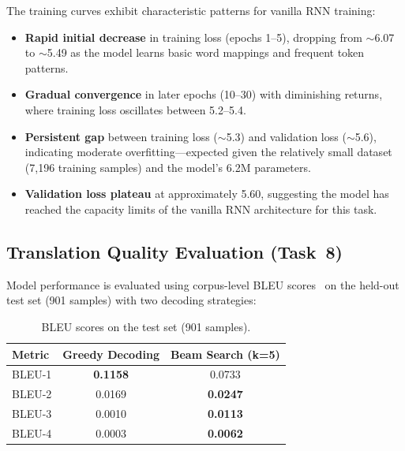 \documentclass[runningheads]{llncs}
\begin{document}
The training curves exhibit characteristic patterns for vanilla RNN training:
\begin{itemize}
    \item \textbf{Rapid initial decrease} in training loss (epochs 1--5), dropping from $\sim$6.07 to $\sim$5.49 as the model learns basic word mappings and frequent token patterns.
    \item \textbf{Gradual convergence} in later epochs (10--30) with diminishing returns, where training loss oscillates between 5.2--5.4.
    \item \textbf{Persistent gap} between training loss ($\sim$5.3) and validation loss ($\sim$5.6), indicating moderate overfitting---expected given the relatively small dataset (7,196 training samples) and the model's 6.2M parameters.
    \item \textbf{Validation loss plateau} at approximately 5.60, suggesting the model has reached the capacity limits of the vanilla RNN architecture for this task.
\end{itemize}

\subsection{Translation Quality Evaluation (Task~8)}

Model performance is evaluated using corpus-level BLEU scores~\cite{papineni2002bleu} on the held-out test set (901 samples) with two decoding strategies:

\begin{table}[H]
\centering
\caption{BLEU scores on the test set (901 samples).}
\label{tab:bleu}
\begin{tabular}{@{}lcc@{}}
\toprule
\textbf{Metric} & \textbf{Greedy Decoding} & \textbf{Beam Search (k=5)} \\
\midrule
BLEU-1 & \textbf{0.1158} & 0.0733 \\
BLEU-2 & 0.0169 & \textbf{0.0247} \\
BLEU-3 & 0.0010 & \textbf{0.0113} \\
BLEU-4 & 0.0003 & \textbf{0.0062} \\
\bottomrule
\end{tabular}
\end{table}
\end{document}
